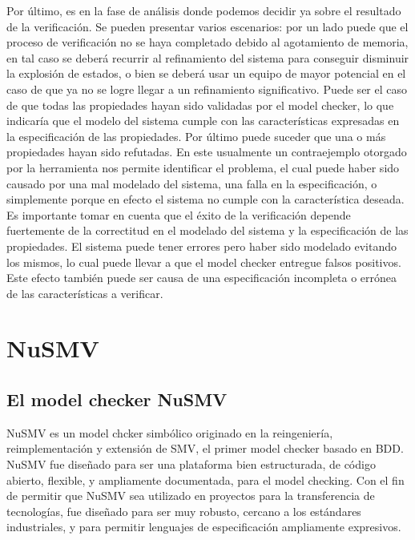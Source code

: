 \documentclass[titlepage, 12pt]{book}
\begin{document}
Por \'ultimo, es en la fase de an\'alisis donde podemos decidir ya sobre el resultado de la verificaci\'on. Se pueden presentar varios escenarios: por un lado puede que el proceso de verificaci\'on no se haya completado debido al agotamiento de memoria, en tal caso se deber\'a recurrir al refinamiento del sistema para conseguir disminuir la explosi\'on de estados, o bien se deber\'a usar un equipo de mayor potencial en el caso de que ya no se logre llegar a un refinamiento significativo. Puede ser el caso de que todas las propiedades hayan sido validadas por el model checker, lo que indicar\'ia que el modelo del sistema cumple con las caracter\'isticas expresadas en la especificaci\'on de las propiedades. Por \'ultimo puede suceder que una o m\'as propiedades hayan sido refutadas. En este usualmente un contraejemplo otorgado por la herramienta nos permite identificar el problema, el cual puede haber sido causado por una mal modelado del sistema, una falla en la especificaci\'on, o simplemente porque en efecto el sistema no cumple con la caracter\'istica deseada.\\

Es importante tomar en cuenta que el \'exito de la verificaci\'on depende fuertemente de la correctitud en el modelado del sistema y la especificaci\'on de las propiedades. El sistema puede tener errores pero haber sido modelado evitando los mismos, lo cual puede llevar a que el model checker entregue falsos positivos. Este efecto tambi\'en puede ser causa de una especificaci\'on incompleta o err\'onea de las caracter\'isticas a verificar.\\







\chapter{NuSMV}
\section{El model checker NuSMV}

NuSMV es un model chcker simb\'olico originado en la reingenier\'ia, reimplementaci\'on y extensi\'on de SMV, el primer model checker basado en BDD. NuSMV fue dise\~nado para ser una plataforma bien estructurada, de c\'odigo abierto, flexible, y ampliamente documentada, para el model checking. Con el fin de permitir que NuSMV sea utilizado en proyectos para la transferencia de tecnolog\'ias, fue dise\~nado para ser muy robusto, cercano a los est\'andares industriales, y para permitir lenguajes de especificaci\'on ampliamente expresivos\cite{Cimatti}.\\
\end{document}
